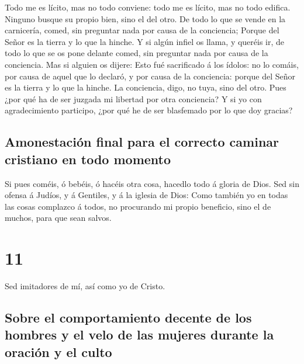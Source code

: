  Todo me es lícito, mas no todo conviene: todo me es
lícito, mas no todo edifica.  Ninguno busque su propio
bien, sino el del otro.  De todo lo que se vende en la
carnicería, comed, sin preguntar nada por causa de la conciencia;
 Porque del Señor es la tierra y lo que la hinche.
 Y si algún infiel os llama, y queréis ir, de todo lo que
se os pone delante comed, sin preguntar nada por causa de la conciencia.
 Mas si alguien os dijere: Esto fué sacrificado á los
ídolos: no lo comáis, por causa de aquel que lo declaró, y por causa de
la conciencia: porque del Señor es la tierra y lo que la hinche.
 La conciencia, digo, no tuya, sino del otro. Pues ¿por
qué ha de ser juzgada mi libertad por otra conciencia?  Y
si yo con agradecimiento participo, ¿por qué he de ser blasfemado por lo
que doy gracias?

\hypertarget{amonestaciuxf3n-final-para-el-correcto-caminar-cristiano-en-todo-momento}{%
\subsection{Amonestación final para el correcto caminar cristiano en
todo
momento}\label{amonestaciuxf3n-final-para-el-correcto-caminar-cristiano-en-todo-momento}}

 Si pues coméis, ó bebéis, ó hacéis otra cosa, hacedlo
todo á gloria de Dios.  Sed sin ofensa á Judíos, y á
Gentiles, y á la iglesia de Dios:  Como también yo en
todas las cosas complazco á todos, no procurando mi propio beneficio,
sino el de muchos, para que sean salvos.

\hypertarget{section-46-11}{%
\section{11}\label{section-46-11}}

 Sed imitadores de mí, así como yo de Cristo.

\hypertarget{sobre-el-comportamiento-decente-de-los-hombres-y-el-velo-de-las-mujeres-durante-la-oraciuxf3n-y-el-culto}{%
\subsection{Sobre el comportamiento decente de los hombres y el velo de
las mujeres durante la oración y el
culto}\label{sobre-el-comportamiento-decente-de-los-hombres-y-el-velo-de-las-mujeres-durante-la-oraciuxf3n-y-el-culto}}

